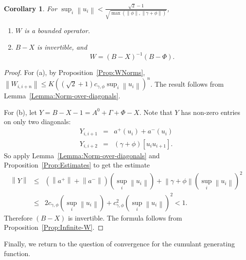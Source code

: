 \documentclass[12pt]{amsart}
\newtheorem{Cor}[Thm]{Corollary}
\theoremstyle{definition}
\newcommand{\norm}[1]{\left \|{#1} \right \|}
\begin{document}
\begin{Cor}
For $\sup_i \norm{u_i} <  \frac{\sqrt{2} - 1}{\sqrt{\max(\norm{\phi}, \norm{\gamma + \phi})}}$,
\begin{enumerate}
\item
$W$ is a bounded operator.
\item
$B - X$ is invertible, and
\[
W = (B - X)^{-1} (B - \Phi).
\]
\end{enumerate}
\end{Cor}
\begin{proof}
For (a), by Proposition~\ref{Prop:WNorms}, $\norm{W_{i, i+n}} \leq K \left((\sqrt{2} + 1) c_{\gamma, \phi} \sup_i \norm{u_i} \right)^n$.
The result follows from Lemma~\ref{Lemma:Norm-over-diagonals}.

For (b), let $Y = B-X-1 = A^0 + \Gamma + \Phi - X$. Note that $Y$ has non-zero entries on only two diagonals:
\begin{eqnarray*}
	Y_{i,i+1} &=& a^+(u_i) + a^-(u_i) \\
	Y_{i,i+2} &=& (\gamma + \phi)[u_i u_{i+1}].
\end{eqnarray*}
So apply Lemma~\ref{Lemma:Norm-over-diagonals} and Proposition~\ref{Prop:Estimates} to get the estimate
\begin{eqnarray*}
	\norm{Y} &\leq& (\norm{a^+} + \norm{a^-})\left(\sup_i \norm{u_i}\right) + \norm{\gamma + \phi} \left(\sup_i \norm{u_i}\right)^2 \\
	&\leq& 2 c_{\gamma, \phi} \left(\sup_i \norm{u_i}\right) + c_{\gamma, \phi}^2 \left(\sup_i \norm{u_i}\right)^2 < 1.
\end{eqnarray*}
Therefore $(B-X)$ is invertible. The formula follows from Proposition~\ref{Prop:Infinite-W}.
\end{proof}

Finally, we return to the question of convergence for the cumulant generating function.
\end{document}
